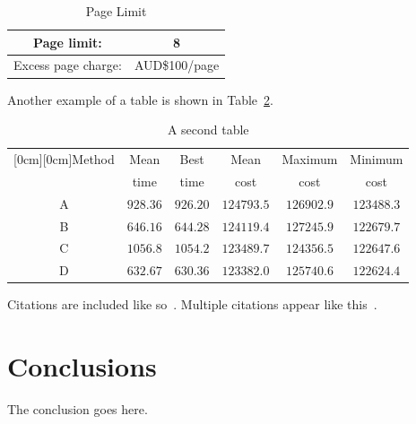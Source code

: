 \documentclass[conference]{IEEEtran}
\begin{document}
\begin{table}
\begin{center}
\renewcommand{\arraystretch}{1.3}
\caption{Page Limit}
\label{table-tab1}
\begin{tabular}{|c|c|}
\hline
Page limit: & 8\\
\hline
Excess page charge: & AUD\$100/page\\
\hline
\end{tabular}
\end{center}
\end{table}

Another example of a table is shown in Table~\ref{table-tab2}.

\begin{table}[h]
\caption{A second table}
\begin{center}
\begin{tabular}{|c|c|c|c|c|c|}
\hline
\multicolumn{1}{|c|}{\raisebox{-1.50ex}[0cm][0cm]{\!Method\!}}
& \multicolumn{1}{|c|}{Mean}
& \multicolumn{1}{|c|}{Best}
& \multicolumn{1}{|c|}{Mean}
& \multicolumn{1}{|c|}{Maximum}
& \multicolumn{1}{|c|}{Minimum} \\
& time & time & cost & cost & cost\\ \hline
A      &  $928.36$  &  $926.20$  &  $124793.5$ & $126902.9$ & $123488.3$ \\ \hline
B      &  $646.16$  &  $644.28$  &  $124119.4$ & $127245.9$ & $122679.7$ \\ \hline
C      &  $1056.8$  &  $1054.2$  &  $123489.7$ & $124356.5$ & $122647.6$ \\ \hline
D      &  $632.67$  &  $630.36$  &  $123382.0$ & $125740.6$ & $122624.4$ \\ \hline
\end{tabular}
\label{table-tab2}
\end{center}
\end{table}

Citations are included like so~\cite{book}.
Multiple citations appear like this~\cite{conf,article}.

\section{Conclusions}
The conclusion goes here.
\end{document}
